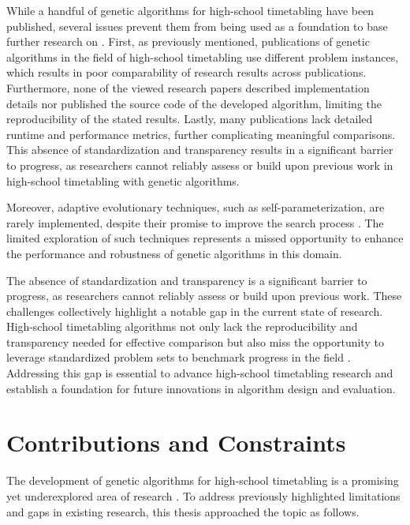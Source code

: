 \documentclass[english,examples]{isasthesis}
\begin{document}
While a handful of genetic algorithms for high-school timetabling have been
published, several issues prevent them from being used as a foundation to base
further research on \cite{Tan2021,quaer2024survey}.
%
First, as previously mentioned, publications of genetic algorithms in the field
of high-school timetabling use different problem instances, which results in
poor comparability of research results across publications.
%
Furthermore, none of the viewed research papers described
implementation details nor published the source code of the developed
algorithm, limiting the reproducibility of the stated results.
%
Lastly, many publications lack detailed runtime and performance metrics,
further complicating meaningful comparisons. This absence of standardization and
transparency results in a significant barrier to progress, as researchers cannot
reliably assess or build upon previous work in high-school timetabling with
genetic algorithms.

Moreover, adaptive evolutionary techniques, such as self-parameterization,
are rarely implemented, despite their promise to improve the search process
\cite{quaer2024survey}.
The limited exploration of such techniques represents a missed opportunity to
enhance the performance and robustness of genetic algorithms in this domain.

The absence of standardization and transparency is a significant barrier to
progress, as researchers cannot reliably assess or build upon previous work.
%
These challenges collectively highlight a notable gap in the current state of
research. High-school timetabling algorithms not only lack the reproducibility
and transparency needed for effective comparison but also miss the opportunity
to leverage standardized problem sets to benchmark progress in the field
\cite{quaer2024survey}.
Addressing this gap is essential to advance high-school timetabling research
and establish a foundation for future innovations in algorithm design and
evaluation.

\section{Contributions and Constraints}
The development of genetic algorithms for high-school timetabling is a promising
yet underexplored area of research \cite{quaer2024survey}.
To address previously highlighted limitations and gaps in existing research,
this thesis approached the topic as follows.
\end{document}
